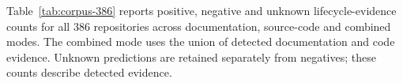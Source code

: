 Table~\ref{tab:corpus-386} reports positive, negative and unknown lifecycle-evidence counts for all 386 repositories across documentation, source-code and combined modes. The combined mode uses the union of detected documentation and code evidence. Unknown predictions are retained separately from negatives; these counts describe detected evidence.
